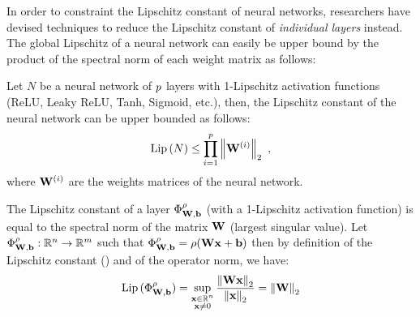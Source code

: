 \drawstar

\noindent
In order to constraint the Lipschitz constant of neural networks, researchers have devised techniques to reduce the Lipschitz constant of \emph{individual layers} instead. 
The global Lipschitz of a neural network can easily be upper bound by the product of the spectral norm of each weight matrix as follows:
\begin{proposition} Let $N$ be a neural network of $p$ layers with 1-Lipschitz activation functions (\eg ReLU,
  Leaky ReLU, Tanh, Sigmoid, etc.), then, the Lipschitz constant of the neural network can be upper bounded as follows:
  \begin{equation}
    \operatorname{Lip}{(N)} \leq \prod_{i=1}^p \norm{\mathbf{W}^{(i)}}_2 \enspace,
    \label{equation:ch3-naive_upper_bound_lipschitz}
  \end{equation}
  where $\mathbf{W}^{(i)}$ are the weights matrices of the neural network.
  \label{proposition:ch3-naive_upper_bound_lipschitz}
\end{proposition}

\begin{remark}
  The Lipschitz constant of a layer $\Phi_{\mathbf{W}, \mathbf{b}}^\rho$ (with a 1-Lipschitz activation function) is equal to the spectral norm of the matrix $\mathbf{W}$ (largest singular value).
  Let $\Phi_{\mathbf{W}, \mathbf{b}}^\rho: \mathbb{R}^n \rightarrow \mathbb{R}^m$ such that $\Phi_{\mathbf{W}, \mathbf{b}}^\rho = \rho(\mathbf{W} \mathbf{x} + \mathbf{b})$ then by definition of the Lipschitz constant () and of the operator norm, we have:
  \begin{equation}
    \operatorname{Lip}{(\Phi_{\mathbf{W}, \mathbf{b}}^\rho)} = \sup_{\substack{\mathbf{x} \in \mathbb{R}^n \\ \mathbf{x} \neq 0}} \frac{\norm{\mathbf{W} \mathbf{x}}_2}{\norm{\mathbf{x}}_2} = \norm{\mathbf{W}}_2
  \end{equation}
\end{remark}

